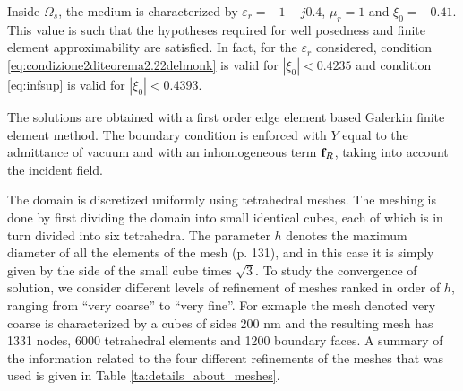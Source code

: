 Inside $\Omega_s$, the medium is characterized by $\varepsilon_r = -1 - j0.4$, 
$\mu_r = 1$ and $\xi_0 = -0.41$. 
This value is such that the hypotheses required for well posedness and 
finite element approximability are satisfied.
In fact, for the $\varepsilon_r$ considered, condition \ref{eq:condizione2diteorema2.22delmonk} 
is valid for $|\xi_0| < 0.4235$ and condition \ref{eq:infsup} is valid for 
$|\xi_0| < 0.4393$.

The solutions are obtained with a first order edge element based Galerkin 
finite element method. The boundary condition is enforced with $Y$ equal to 
the admittance of vacuum and with an inhomogeneous term ${\bf f}_R$, 
taking into account the incident field. 

The domain is discretized uniformly using tetrahedral meshes.
The meshing is done by first dividing the domain into small identical cubes,
each of which is in turn divided into six tetrahedra.
The parameter $h$ denotes the maximum diameter of all the elements of the 
mesh \cite{handbook} (p. 131), and in this case it is simply given by the side of 
the small cube times $\sqrt{3}$.
To study the convergence of solution, we consider different levels 
of refinement of meshes ranked in order of $h$,
ranging from ``very coarse'' to ``very fine''.
For exmaple the mesh denoted very coarse is characterized by a cubes of sides 
200 nm and the resulting mesh has 1331 nodes, 6000 tetrahedral elements and 
1200 boundary faces.
A summary of the information related to 
the four different refinements of the meshes that was used 
is given in Table \ref{ta:details_about_meshes}.


